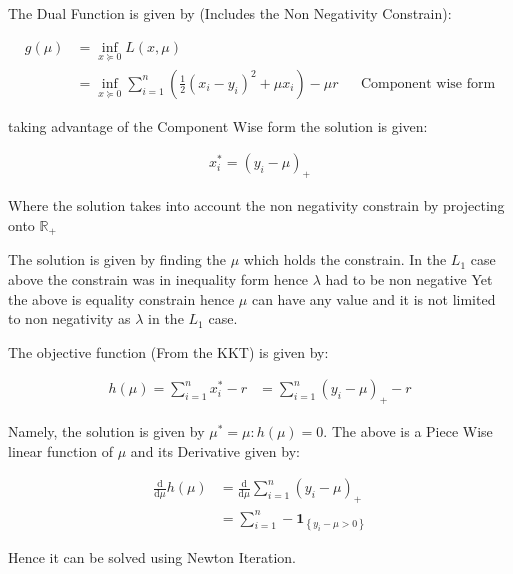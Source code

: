\documentclass[]{article}
\newcommand{\MyParen}[1]{\left( #1 \right)}
\begin{document}
	The Dual Function is given by (Includes the Non Negativity Constrain):
	
	\begin{align*}
	g \left( \mu \right) & = \inf_{x \succeq 0} L \left( x, \mu \right) && \text{} \\
	& = \inf_{x \succeq 0} \sum_{i = 1}^{n} \left( \frac{1}{2} { \left( {x}_{i} - {y}_{i} \right) }^{2} + \mu {x}_{i} \right) - \mu r && \text{Component wise form}
	\end{align*}
	
	taking advantage of the Component Wise form the solution is given:
	
	\begin{align*}
	{x}_{i}^{\ast} = { \left( {y}_{i} - \mu \right) }_{+}
	\end{align*}
	
	Where the solution takes into account the non negativity constrain by projecting onto $ {\mathbb{R}}_{+} $
	
	The solution is given by finding the $ \mu $ which holds the constrain. In the $ {L}_{1} $ case above the constrain was in inequality form hence $ \lambda $ had to be non negative Yet the above is equality constrain hence $ \mu $ can have any value and it is not limited to non negativity as $ \lambda $ in the $ {L}_{1} $ case.
	
	The objective function (From the KKT) is given by:
	
	\begin{align*}
	h \left( \mu \right) = \sum_{i = 1}^{n} {x}_{i}^{\ast} - r & = \sum_{i = 1}^{n} { \left( {y}_{i} - \mu \right) }_{+} - r
	\end{align*}
	
	Namely, the solution is given by $ {\mu}^{\ast} = \mu : h \MyParen{\mu} = 0 $. The above is a Piece Wise linear function of $ \mu $ and its Derivative given by:
	
	\begin{align*}
	\frac{\mathrm{d} }{\mathrm{d} \mu} h \left( \mu \right) & = \frac{\mathrm{d} }{\mathrm{d} \mu} \sum_{i = 1}^{n} { \left( {y}_{i} - \mu \right) }_{+} \\
	& = \sum_{i = 1}^{n} -{ \mathbf{1} }_{\left\{ {y}_{i} - \mu > 0 \right\}}
	\end{align*}
	
	Hence it can be solved using Newton Iteration.
	
\end{document}

